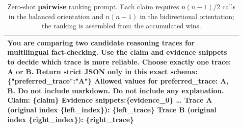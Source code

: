 \begin{table}[htbp]
\centering\small
\begin{tabular}{@{}p{0.95\linewidth}@{}}
\toprule
{\ttfamily\scriptsize
You are comparing two candidate reasoning traces for multilingual fact-checking.\newline
Use the claim and evidence snippets to decide which trace is more reliable.\newline
Choose exactly one trace: A or B.\newline
\newline
Return strict JSON only in this exact schema:\newline
\{"preferred\_trace":"A"\}\newline
Allowed values for preferred\_trace: A, B.\newline
Do not include markdown. Do not include any explanation.\newline
\newline
Claim:\newline
\{claim\}\newline
\newline
Evidence snippets:\newline
[0] \{evidence\_0\} \ldots\newline
\newline
Trace A (original index \{left\_index\}):\newline
\{left\_trace\}\newline
\newline
Trace B (original index \{right\_index\}):\newline
\{right\_trace\}
} \\
\bottomrule
\end{tabular}
\caption{Zero-shot \textbf{pairwise} ranking prompt. Each claim requires $n(n-1)/2$ calls in the
balanced orientation and $n(n-1)$ in the bidirectional orientation; the ranking is assembled from the
accumulated wins.}
\label{tab:prompt-pairwise}

\end{table}

